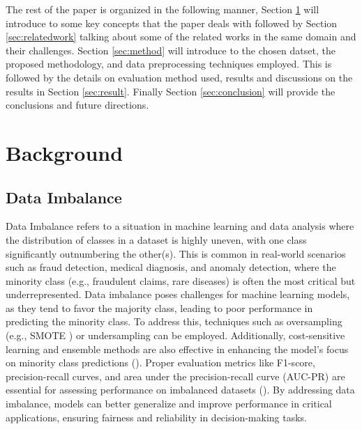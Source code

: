 \documentclass[twoside,11pt]{article}
\begin{document}
The rest of the paper is organized in the following manner, Section \ref{sec:background} will introduce to some key concepts that the paper deals with followed by Section \ref{sec:relatedwork} talking about some of the related works in the same domain and their challenges. Section \ref{sec:method} will introduce to the chosen datset, the proposed methodology, and data preprocessing techniques employed. This is followed by the details on evaluation method used, results and discussions on the results in Section \ref{sec:result}. Finally Section \ref{sec:conclusion} will provide the conclusions and future directions.

\section{Background} \label{sec:background}
\subsection{Data Imbalance}
Data Imbalance refers to a situation in machine learning and data analysis where the distribution of classes in a dataset is highly uneven, with one class significantly outnumbering the other(s). This is common in real-world scenarios such as fraud detection, medical diagnosis, and anomaly detection, where the minority class (e.g., fraudulent claims, rare diseases) is often the most critical but underrepresented. Data imbalance poses challenges for machine learning models, as they tend to favor the majority class, leading to poor performance in predicting the minority class.
To address this, techniques such as oversampling (e.g., SMOTE \citealp{chawlaSMOTESyntheticMinority2002}) or undersampling can be employed. Additionally, cost-sensitive learning and ensemble methods are also effective in enhancing the model's focus on minority class predictions (\citealp{garcia2009}). Proper evaluation metrics like F1-score, precision-recall curves, and area under the precision-recall curve (AUC-PR) are essential for assessing performance on imbalanced datasets (\citealp{fernandezPerformanceMeasures2018a}).
By addressing data imbalance, models can better generalize and improve performance in critical applications, ensuring fairness and reliability in decision-making tasks.
\end{document}
